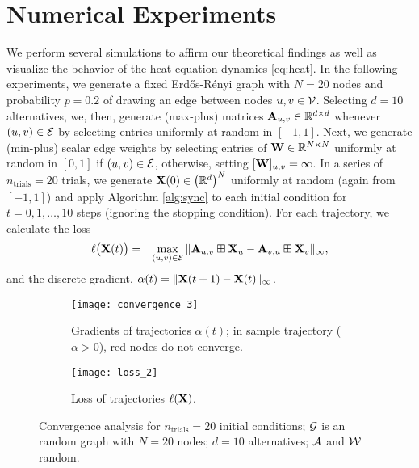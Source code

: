 \documentclass[letterpaper, 10 pt, conference]{ieeeconf}
\begin{document}
\section{Numerical Experiments}
\label{sec:experiments}

We perform several simulations to affirm our theoretical findings as well as visualize the behavior of the heat equation dynamics \eqref{eq:heat}. In the following experiments, we generate a fixed Erd\H{o}s-R\'{e}nyi graph with $N=20$ nodes and probability $p=0.2$ of drawing an edge between nodes $u, v \in \mathcal{V}$. Selecting $d=10$ alternatives, we, then, generate (max-plus) matrices $\mathbf{A}_{u,v} \in \mathbb{R}^{d \times d}$ whenever $(u,v) \in \mathcal{E}$ by selecting entries uniformly at random in $[-1,1]$. Next, we generate (min-plus) scalar edge weights by selecting entries of $\mathbf{W} \in \mathbb{R}^{N \times N}$ uniformly at random in $[0,1]$ if $(u,v) \in \mathcal{E}$, otherwise, setting $[\mathbf{W}]_{u,v} = \infty$. In a series of $n_{\text{trials}} = 20$ trials, we generate $\mathbf{X}(0) \in \left(\mathbb{R}^{d}\right)^N$ uniformly at random (again from $[-1,1]$) and apply Algorithm \ref{alg:sync} to each initial condition for $t = 0, 1, \dots, 10$ steps (ignoring the stopping condition). For each trajectory, we calculate the loss
\begin{align*}
    \ell\bigl( \mathbf{X}(t) \bigr) &=& \max_{(u,v) \in \mathcal{E}} \| \mathbf{A}_{u,v} \boxplus \mathbf{X}_u - \mathbf{A}_{v,u} \boxplus \mathbf{X}_v \|_{\infty},
\end{align*}
and the discrete gradient, $\alpha(t)  = \| \mathbf{X}(t+1) - \mathbf{X}(t) \|_{\infty}$.

\begin{figure}[h]
\centering
\begin{subfigure}[b]{0.5\textwidth}
    \centering
    \texttt{[image: convergence\_3]}
    \caption{Gradients of trajectories $\alpha(t)$; in sample trajectory ($\alpha>0$), red nodes do not converge.}
    \label{fig:convergence}
\end{subfigure}
\begin{subfigure}[b]{0.5\textwidth}
    \centering
    \hspace{-1cm} \texttt{[image: loss\_2]}
    \caption{Loss of trajectories $\ell(\mathbf{X})$.}
    \label{fig:loss}
\end{subfigure}
\caption{Convergence analysis for $n_{\mathrm{trials}} = 20$ initial conditions; $\mathcal{G}$ is an random graph with $N=20$ nodes; $d=10$ alternatives; $\mathcal{A}$ and $\mathcal{W}$ random.  }
\end{figure}
\end{document}
